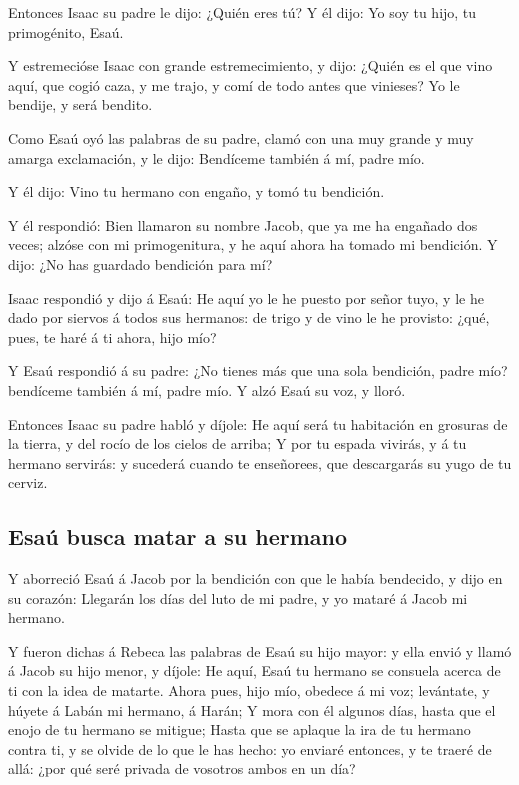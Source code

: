  Entonces Isaac su padre le dijo: ¿Quién eres tú? Y él
dijo: Yo soy tu hijo, tu primogénito, Esaú.

 Y estremecióse Isaac con grande estremecimiento, y dijo:
¿Quién es el que vino aquí, que cogió caza, y me trajo, y comí de todo
antes que vinieses? Yo le bendije, y será bendito.

 Como Esaú oyó las palabras de su padre, clamó con una muy
grande y muy amarga exclamación, y le dijo: Bendíceme también á mí,
padre mío.

 Y él dijo: Vino tu hermano con engaño, y tomó tu
bendición.

 Y él respondió: Bien llamaron su nombre Jacob, que ya me
ha engañado dos veces; alzóse con mi primogenitura, y he aquí ahora ha
tomado mi bendición. Y dijo: ¿No has guardado bendición para mí?

 Isaac respondió y dijo á Esaú: He aquí yo le he puesto por
señor tuyo, y le he dado por siervos á todos sus hermanos: de trigo y de
vino le he provisto: ¿qué, pues, te haré á ti ahora, hijo mío?

 Y Esaú respondió á su padre: ¿No tienes más que una sola
bendición, padre mío? bendíceme también á mí, padre mío. Y alzó Esaú su
voz, y lloró.

 Entonces Isaac su padre habló y díjole: He aquí será tu
habitación en grosuras de la tierra, y del rocío de los cielos de
arriba;  Y por tu espada vivirás, y á tu hermano servirás:
y sucederá cuando te enseñorees, que descargarás su yugo de tu cerviz.

\hypertarget{esauxfa-busca-matar-a-su-hermano}{%
\subsection{Esaú busca matar a su
hermano}\label{esauxfa-busca-matar-a-su-hermano}}

 Y aborreció Esaú á Jacob por la bendición con que le había
bendecido, y dijo en su corazón: Llegarán los días del luto de mi padre,
y yo mataré á Jacob mi hermano.

 Y fueron dichas á Rebeca las palabras de Esaú su hijo
mayor: y ella envió y llamó á Jacob su hijo menor, y díjole: He aquí,
Esaú tu hermano se consuela acerca de ti con la idea de matarte.
 Ahora pues, hijo mío, obedece á mi voz; levántate, y
húyete á Labán mi hermano, á Harán;  Y mora con él algunos
días, hasta que el enojo de tu hermano se mitigue;  Hasta
que se aplaque la ira de tu hermano contra ti, y se olvide de lo que le
has hecho: yo enviaré entonces, y te traeré de allá: ¿por qué seré
privada de vosotros ambos en un día?

